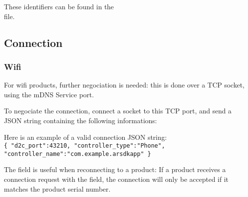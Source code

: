 These identifiers can be found in the \\
 file.

\newpage

\subsection{Connection}

\subsubsection{Wifi}

For wifi products, further negociation is needed: this is done over a TCP socket, using the mDNS Service port.

To negociate the connection, connect a socket to this TCP port, and send a JSON string containing the following informations:
\begin{table}[h]
\centering
{}
\caption{Available keys for connection JSON}
\end{table}

Here is an example of a valid connection JSON string:\\
\texttt{\{ "d2c\_port":43210, "controller\_type":"Phone", \\
"controller\_name":"com.example.arsdkapp" \}}


The  field is useful when reconnecting to a product: If a product receives a connection request with the  field, the connection will only be accepted if it matches the product serial number.

\newpage

